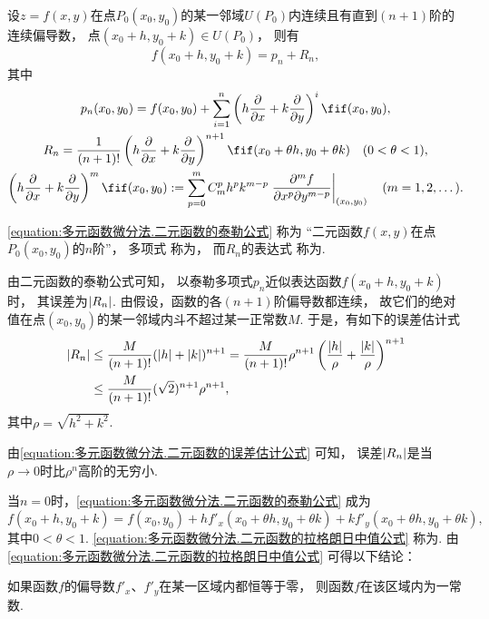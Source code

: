\begin{theorem}\label{theorem:多元函数微分法.二元函数的泰勒公式}
\def\oprt#1{%
	\left(h\pdv{x}+k\pdv{y}\right)%
	\ifx\relax#1\relax\else\ifnum1=0#1\relax\else^{#1}\fi\fi%
}
设\(z=f(x,y)\)在点\(P_0(x_0,y_0)\)的某一邻域\(U(P_0)\)内连续且有直到\((n+1)\)阶的连续偏导数，
点\((x_0+h,y_0+k) \in U(P_0)\)，
则有\begin{equation}\label{equation:多元函数微分法.二元函数的泰勒公式}
	f(x_0+h,y_0+k) = p_n + R_n,
\end{equation}
其中\begin{gather}
	p_n(x_0,y_0)
	=f(x_0,y_0)
	+ \sum_{i=1}^n \oprt{i} f(x_0,y_0),
	\label{equation:多元函数微分法.二元函数的泰勒多项式} \\
	R_n = \frac{1}{(n+1)!} \oprt{n+1} f(x_0+\theta h,y_0+\theta k)
	\quad (0 < \theta < 1),
	\label{equation:多元函数微分法.二元函数的泰勒公式的拉格朗日型余项} \\
	\oprt{m} f(x_0,y_0)
	\defeq
	\sum_{p=0}^{m} C_m^p h^p k^{m-p}
		\eval{
			\frac{\partial^m f}{\partial x^p \partial y^{m-p}}
		}_{(x_0,y_0)}
	\quad(m=1,2,\dotsc).
\end{gather}

\rm
\cref{equation:多元函数微分法.二元函数的泰勒公式} 称为
“二元函数\(f(x,y)\)在点\(P_0(x_0,y_0)\)的\(n\)阶”，
多项式  称为，
而\(R_n\)的表达式 
称为.
\end{theorem}
由二元函数的泰勒公式可知，
以泰勒多项式\(p_n\)近似表达函数\(f(x_0+h,y_0+k)\)时，
其误差为\(\abs{R_n}\).
由假设，函数的各\((n+1)\)阶偏导数都连续，
故它们的绝对值在点\((x_0,y_0)\)的某一邻域内斗不超过某一正常数\(M\).
于是，有如下的误差估计式\begin{align}
	\abs{R_n}
	&\leq \frac{M}{(n+1)!} (\abs{h}+\abs{k})^{n+1}
	= \frac{M}{(n+1)!} \rho^{n+1}
		\left( \frac{\abs{h}}{\rho} + \frac{\abs{k}}{\rho} \right)^{n+1}
		\notag \\
	&\leq \frac{M}{(n+1)!} (\sqrt{2})^{n+1} \rho^{n+1},
	\label{equation:多元函数微分法.二元函数的误差估计公式}
\end{align}
其中\(\rho=\sqrt{h^2+k^2}\).

由\cref{equation:多元函数微分法.二元函数的误差估计公式} 可知，
误差\(\abs{R_n}\)是当\(\rho\to0\)时比\(\rho^n\)高阶的无穷小.

当\(n=0\)时，\cref{equation:多元函数微分法.二元函数的泰勒公式} 成为
\begin{equation}\label{equation:多元函数微分法.二元函数的拉格朗日中值公式}
	f(x_0+h,y_0+k)
	= f(x_0,y_0)
	+ h f'_x(x_0+\theta h,y_0+\theta k)
	+ k f'_y(x_0+\theta h,y_0+\theta k),
\end{equation}
其中\(0<\theta<1\).
\cref{equation:多元函数微分法.二元函数的拉格朗日中值公式}
称为.
由\cref{equation:多元函数微分法.二元函数的拉格朗日中值公式}
可得以下结论：
\begin{proposition}
如果函数\(f\)的偏导数\(f'_x\)、\(f'_y\)在某一区域内都恒等于零，
则函数\(f\)在该区域内为一常数.
\end{proposition}

